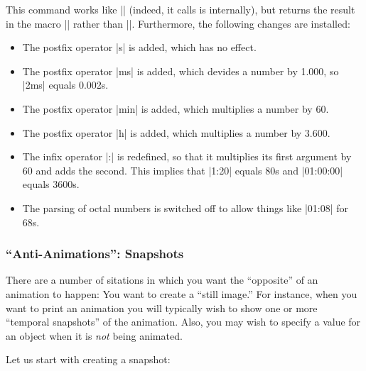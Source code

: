 \begin{command}{\pgfparsetime{}}
  This command works like |\pgfmathparse| (indeed, it calls is
  internally), but returns the result in the macro |\pgftimeresult|
  rather than |\pgfmathresult|. Furthermore, the following changes are
  installed:

  \begin{itemize}
  \item 
    The postfix operator |s| is added, which has no effect.
  \item The postfix operator |ms| is added, which devides a number by
    1.000, so |2ms| equals 0.002s.
  \item
    The postfix operator |min| is added, which multiplies a number by
    60.
  \item The postfix operator |h| is added, which multiplies a number by
    3.600.
  \item The infix operator |:| is redefined, so that it multiplies its
    first argument by 60 and adds the second. This implies that
    |1:20| equals 80s and |01:00:00| equals 3600s.
  \item The parsing of octal numbers is switched off to allow things
    like |01:08| for 68s.
  \end{itemize}
\end{command}




\subsubsection{``Anti-Animations'': Snapshots}

There are a number of sitations in which you want the ``opposite'' of
an animation to happen: You want to create a ``still image.'' For
instance, when you want to print an animation you will typically wish
to show one or more ``temporal snapshots'' of the animation. Also, you
may wish to specify a value for an object when it is \emph{not} being
animated.

Let us start with creating a snapshot:

